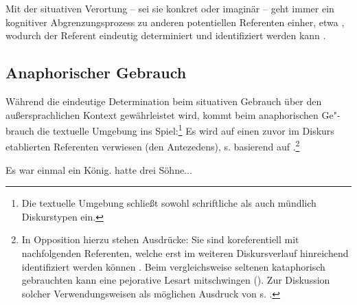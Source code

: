 Mit der situativen  Verortung -- sei sie konkret oder imaginär -- geht immer ein kognitiver Abgrenzungsprozess zu anderen potentiellen Referenten einher, etwa   \parencite[vgl.][70]{Bisle-Muller1991}, wodurch der Referent eindeutig determiniert und identifiziert werden kann \parencite{Hoffmann2009}. 

 
\subsection{Anaphorischer Gebrauch}\label{sec:anaphorisch}

Während die eindeutige Determination beim situativen  Gebrauch über den außersprachlichen Kontext gewährleistet wird, kommt beim anaphorischen  Ge"-brauch die textuelle Umgebung ins Spiel:\footnote{Die textuelle Umgebung schließt sowohl schriftliche als auch mündlich Diskurstypen ein.} Es wird auf einen zuvor im Diskurs etablierten Referenten verwiesen (den Antezedens), s.  basierend auf \textcite[][229]{Himmelmann1996}.{\footnote{In Opposition hierzu stehen  Ausdrücke: Sie sind koreferentiell  mit nachfolgenden Referenten, welche erst im weiteren Diskursverlauf  hinreichend identifiziert werden können \parencite[s.][161--162]{Veldre-Gerner2007}. Beim vergleichsweise seltenen kataphorisch gebrauchten  kann eine pejorative Lesart mitschwingen (). Zur Diskussion solcher Verwendungsweisen als möglichen Ausdruck von  s. \textcite[533]{deMulder2011}.}}

\begin{exe}
	\ex \label{ex:anaph} Es war einmal ein König.  hatte drei Söhne...
\end{exe}

